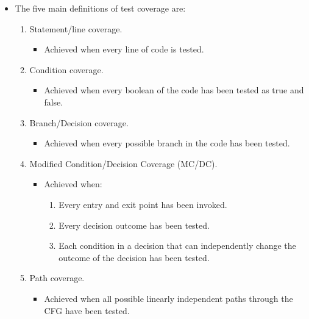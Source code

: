 \documentclass{article}
\begin{document}
\begin{itemize}
\begin{itemize}
		\item Coverage can be defined in multiple ways.
	\end{itemize}
	\item The five main definitions of test coverage are:
	\begin{enumerate}
		\item Statement/line coverage.
		\begin{itemize}
			\item Achieved when every line of code is tested.
		\end{itemize}
		\item Condition coverage.
		\begin{itemize}
			\item Achieved when every boolean of the code has been tested as true and false.
		\end{itemize}
		\item Branch/Decision coverage.
		\begin{itemize}
			\item Achieved when every possible branch in the code has been tested.
		\end{itemize}
		\item Modified Condition/Decision Coverage (MC/DC).
		\begin{itemize}
			\item Achieved when:
			\begin{enumerate}
				\item Every entry and exit point has been invoked.
				\item Every decision outcome has been tested.
				\item Each condition in a decision that can independently change the outcome of the decision has been tested.
			\end{enumerate}
		\end{itemize}
		\item Path coverage.
		\begin{itemize}
			\item Achieved when all possible linearly independent paths through the CFG have been tested.
		\end{itemize}
	\end{enumerate}
\end{itemize}

\ifdefined\iscombined
	\newpage
\else
	
\end{document}
